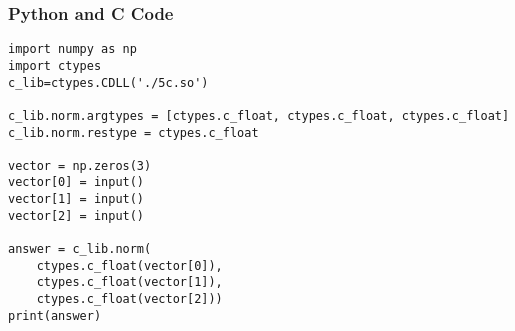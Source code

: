 \documentclass{beamer}
\begin{document}
\begin{frame}[fragile]
\frametitle{Python and C Code}
\begin{lstlisting}
import numpy as np
import ctypes
c_lib=ctypes.CDLL('./5c.so')

c_lib.norm.argtypes = [ctypes.c_float, ctypes.c_float, ctypes.c_float]
c_lib.norm.restype = ctypes.c_float

vector = np.zeros(3)
vector[0] = input()
vector[1] = input()
vector[2] = input()

answer = c_lib.norm(
    ctypes.c_float(vector[0]),
    ctypes.c_float(vector[1]), 
    ctypes.c_float(vector[2]))
print(answer)
\end{lstlisting}

\end{frame}
\end{document}
